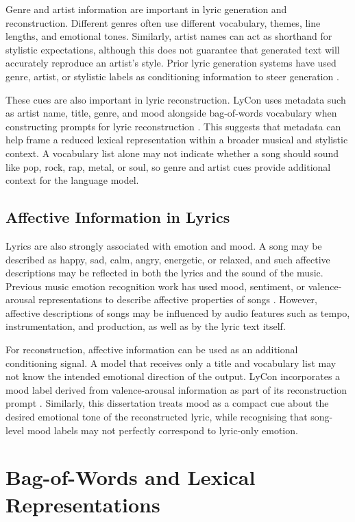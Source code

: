 Genre and artist information are important in lyric generation and reconstruction. Different genres often use different vocabulary, themes, line lengths, and emotional tones. Similarly, artist names can act as shorthand for stylistic expectations, although this does not guarantee that generated text will accurately reproduce an artist's style. Prior lyric generation systems have used genre, artist, or stylistic labels as conditioning information to steer generation \cite{potash2015ghostwriter,cai2024genre}.

These cues are also important in lyric reconstruction. LyCon uses metadata such as artist name, title, genre, and mood alongside bag-of-words vocabulary when constructing prompts for lyric reconstruction \cite{kim2024lycon}. This suggests that metadata can help frame a reduced lexical representation within a broader musical and stylistic context. A vocabulary list alone may not indicate whether a song should sound like pop, rock, rap, metal, or soul, so genre and artist cues provide additional context for the language model.

\subsection{Affective Information in Lyrics}

Lyrics are also strongly associated with emotion and mood. A song may be described as happy, sad, calm, angry, energetic, or relaxed, and such affective descriptions may be reflected in both the lyrics and the sound of the music. Previous music emotion recognition work has used mood, sentiment, or valence-arousal representations to describe affective properties of songs \cite{delbouys2018musicmood}. However, affective descriptions of songs may be influenced by audio features such as tempo, instrumentation, and production, as well as by the lyric text itself.

For reconstruction, affective information can be used as an additional conditioning signal. A model that receives only a title and vocabulary list may not know the intended emotional direction of the output. LyCon incorporates a mood label derived from valence-arousal information as part of its reconstruction prompt \cite{kim2024lycon}. Similarly, this dissertation treats mood as a compact cue about the desired emotional tone of the reconstructed lyric, while recognising that song-level mood labels may not perfectly correspond to lyric-only emotion.

\section{Bag-of-Words and Lexical Representations}

